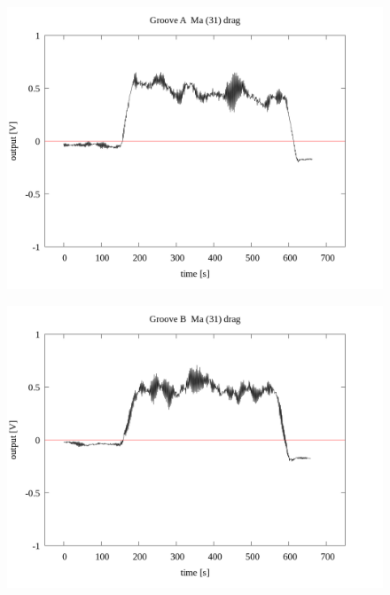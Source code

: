 \documentclass[a4paper]{jsarticle}
\begin{document}
\begin{figure}[htbp]
    \footnotesize
    \begin{center}
        \includegraphics[width=140mm]{../../../33_result/210806/moving_average/31/drag/Groove_A_ma(31)_drag.png}
    \end{center}
\end{figure}

\begin{figure}[htbp]
    \footnotesize
    \begin{center}
        \includegraphics[width=140mm]{../../../33_result/210806/moving_average/31/drag/Groove_B_ma(31)_drag.png}
    \end{center}
\end{figure}
\end{document}
